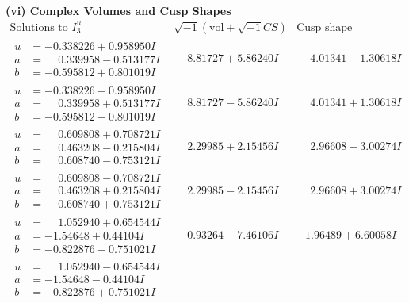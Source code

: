 \documentclass[1p]{elsarticle_modified}
\theoremstyle{definition}
\newcommand{\I}{\sqrt{-1}}
\begin{document}
\newpage\flushleft \textbf{(vi) Complex Volumes and Cusp Shapes}
$$\begin{array}{c|c|c}  
\text{Solutions to }I^u_{3}& \I (\text{vol} + \sqrt{-1}CS) & \text{Cusp shape}\\
 \hline 
\begin{aligned}
u &= -0.338226 + 0.958950 I \\
a &= \phantom{-}0.339958 - 0.513177 I \\
b &= -0.595812 + 0.801019 I\end{aligned}
 & \phantom{-}8.81727 + 5.86240 I & \phantom{-}4.01341 - 1.30618 I \\ \hline\begin{aligned}
u &= -0.338226 - 0.958950 I \\
a &= \phantom{-}0.339958 + 0.513177 I \\
b &= -0.595812 - 0.801019 I\end{aligned}
 & \phantom{-}8.81727 - 5.86240 I & \phantom{-}4.01341 + 1.30618 I \\ \hline\begin{aligned}
u &= \phantom{-}0.609808 + 0.708721 I \\
a &= \phantom{-}0.463208 - 0.215804 I \\
b &= \phantom{-}0.608740 - 0.753121 I\end{aligned}
 & \phantom{-}2.29985 + 2.15456 I & \phantom{-}2.96608 - 3.00274 I \\ \hline\begin{aligned}
u &= \phantom{-}0.609808 - 0.708721 I \\
a &= \phantom{-}0.463208 + 0.215804 I \\
b &= \phantom{-}0.608740 + 0.753121 I\end{aligned}
 & \phantom{-}2.29985 - 2.15456 I & \phantom{-}2.96608 + 3.00274 I \\ \hline\begin{aligned}
u &= \phantom{-}1.052940 + 0.654544 I \\
a &= -1.54648 + 0.44104 I \\
b &= -0.822876 - 0.751021 I\end{aligned}
 & \phantom{-}0.93264 - 7.46106 I & -1.96489 + 6.60058 I \\ \hline\begin{aligned}
u &= \phantom{-}1.052940 - 0.654544 I \\
a &= -1.54648 - 0.44104 I \\
b &= -0.822876 + 0.751021 I\end{aligned}

\end{array}$$
\end{document}
